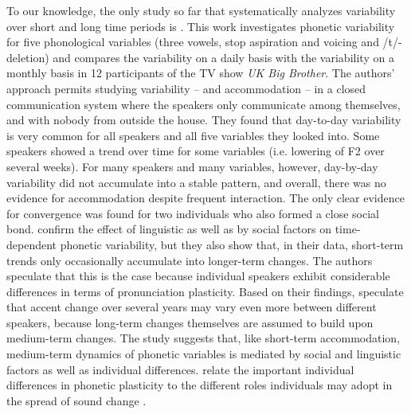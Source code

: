 \documentclass[output=paper]{langscibook}
\begin{document}
To our knowledge, the only study so far that systematically analyzes variability over short and long time periods is \textcite{sonderegger_medium-term_2017}. This work investigates phonetic variability for five phonological variables (three vowels, stop aspiration and voicing and /t/-deletion) and compares the variability on a daily basis with the variability on a monthly basis in 12 participants of the TV show \textit{UK Big Brother}. The authors' approach permits studying variability – and accommodation – in a closed communication system where the speakers only communicate among themselves, and with nobody from outside the house. They found that day-to-day variability is very common for all speakers and all five variables they looked into. Some speakers showed a trend over time for some variables (i.e. lowering of F2 over several weeks). For many speakers and many variables, however, day-by-day variability did not accumulate into a stable pattern, and overall, there was no evidence for accommodation despite frequent interaction. The only clear evidence for convergence was found for two individuals who also formed a close social bond. \textcite{sonderegger_medium-term_2017} confirm the effect of linguistic as well as by social factors on time-dependent phonetic variability, but they also show that, in their data, short-term trends only occasionally accumulate into longer-term changes. The authors speculate that this is the case because individual speakers exhibit considerable differences in terms of pronunciation plasticity. Based on their findings, \citet{sonderegger_medium-term_2017} speculate that accent change over several years may vary even more  between different speakers, because long-term changes themselves are assumed to build upon medium-term changes. The study suggests that, like short-term accommodation, medium-term dynamics of phonetic variables is mediated by social and linguistic factors as well as individual differences. \textcite{sonderegger_medium-term_2017} relate the important individual differences in phonetic plasticity to the different roles individuals may adopt in the spread of sound change \citep[reminiscent of the contrasts between early adopters and innovators, see][]{milroy_linguistic_1985}.
\end{document}
